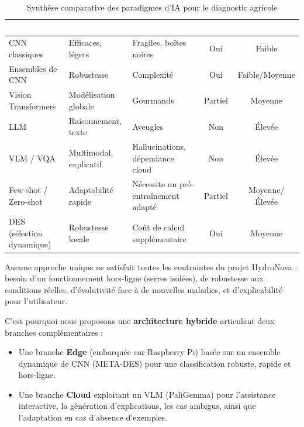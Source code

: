 \begin{table}[htbp]
	\centering
	\small
	\begin{tabularx}{\textwidth}{|l|X|X|c|c|}
		\hline
		\rowcolor[HTML]{2C3E50}
		\textcolor{white}{\textbf{Approche}} & \textcolor{white}{\textbf{Apports}} & \textcolor{white}{\textbf{Limites}} & \textcolor{white}{\textbf{Offline}} & \textcolor{white}{\textbf{Explicabilité}} \\ \hline
		CNN classiques & Efficaces, légers & Fragiles, boîtes noires & Oui & Faible \\
		Ensembles de CNN & Robustesse & Complexité & Oui & Faible/Moyenne \\
		Vision Transformers & Modélisation globale & Gourmands & Partiel & Moyenne \\
		LLM & Raisonnement, texte & Aveugles & Non & Élevée \\
		VLM / VQA & Multimodal, explicatif & Hallucinations, dépendance cloud & Non & Élevée \\
		Few-shot / Zero-shot & Adaptabilité rapide & Nécessite un pré-entraînement adapté & Partiel & Moyenne/Élevée \\
		DES (sélection dynamique) & Robustesse locale & Coût de calcul supplémentaire & Oui & Moyenne \\ \hline
	\end{tabularx}
	\caption{Synthèse comparative des paradigmes d'IA pour le diagnostic agricole}
	\label{tab:synthese}
\end{table}

Aucune approche unique ne satisfait toutes les contraintes du projet HydroNova : besoin d'un fonctionnement hors-ligne (serres isolées), de robustesse aux conditions réelles, d'évolutivité face à de nouvelles maladies, et d'explicabilité pour l'utilisateur.

C'est pourquoi nous proposons une \textbf{architecture hybride} articulant deux branches complémentaires :

\begin{itemize}
	\item Une branche \textbf{Edge} (embarquée sur Raspberry Pi) basée sur un ensemble dynamique de CNN (META-DES) pour une classification robuste, rapide et hors-ligne.
	\item Une branche \textbf{Cloud} exploitant un VLM (PaliGemma) pour l'assistance interactive, la génération d'explications, les cas ambigus, ainsi que l'adaptation en cas d'absence d'exemples.
\end{itemize}

